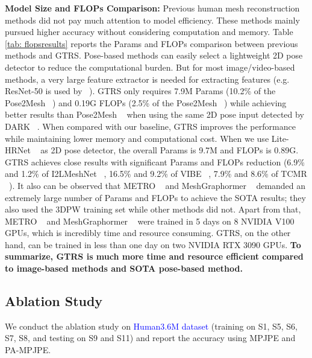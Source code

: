 \documentclass[sigconf]{acmart}
\begin{document}
\textbf{Model Size and FLOPs Comparison:} \label{sec:FLOPs}
Previous human mesh reconstruction methods did not pay much attention to model efficiency. These methods mainly pursued higher accuracy without considering computation and memory. Table \ref{tab: flopsresults} reports the Params and FLOPs comparison between previous methods and GTRS. Pose-based methods can easily select a lightweight 2D pose detector to reduce the computational burden. But for most image/video-based methods, a very large feature extractor is needed for extracting features (e.g. ResNet-50 is used by ~\cite{TCMR_Choi_2021,kocabas2020vibe,Kolotouros2019SPIN}). GTRS only requires 7.9M Params (10.2\% of the Pose2Mesh ~\cite{Choi_2020_ECCV_Pose2Mesh}) and 0.19G FLOPs (2.5\% of the Pose2Mesh ~\cite{Choi_2020_ECCV_Pose2Mesh}) while achieving better results than Pose2Mesh ~\cite{Choi_2020_ECCV_Pose2Mesh} when using the same 2D pose input detected by DARK ~\cite{darkpose_2020}. When compared with our baseline, GTRS improves the performance while maintaining lower memory and computational cost. When we use Lite-HRNet ~\cite{LiteHRNet} as 2D pose detector, the overall Params is 9.7M and FLOPs is 0.89G. GTRS achieves close results with significant Params and FLOPs reduction (6.9\% and 1.2\% of I2LMeshNet ~\cite{Moon_I2L_MeshNet}, 16.5\% and 9.2\% of VIBE  ~\cite{kocabas2020vibe}, 7.9\% and 8.6\% of TCMR ~\cite{TCMR_Choi_2021}). It also can be observed that METRO ~\cite{lin2021metro} and MeshGraphormer ~\cite{lin2021metro} demanded  an extremely large number of Params and FLOPs to achieve the SOTA results; they also used the 3DPW training set while other methods did not. Apart from that, METRO ~\cite{lin2021metro} and MeshGraphormer ~\cite{lin2021metro} were trained in 5 days on 8 NVIDIA V100 GPUs, which is incredibly time and resource consuming. GTRS, on the other hand, can be trained in less than one day on two NVIDIA RTX 3090 GPUs. \textbf{To summarize, GTRS is much more time and resource efficient compared to image-based methods and SOTA pose-based method.} 

\subsection{Ablation Study} \label{sec:ablation}
We conduct the ablation study on  \textcolor{blue}{Human3.6M dataset} (training on S1, S5, S6, S7, S8, and testing on S9 and S11) and report the accuracy using MPJPE and PA-MPJPE. 
\end{document}
